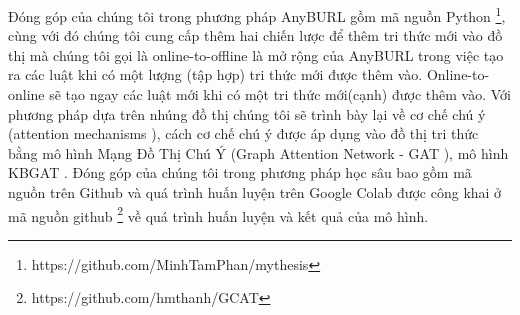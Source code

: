 Đóng góp của chúng tôi trong phương pháp AnyBURL\cite{burl} gồm mã nguồn Python \footnote{https://github.com/MinhTamPhan/mythesis}, cùng với đó chúng tôi cung cấp thêm hai chiến lược để thêm tri thức mới vào đồ thị mà chúng tôi gọi là online-to-offline là mở rộng của AnyBURL trong việc tạo ra các luật khi có một lượng (tập hợp) tri thức mới được thêm vào. Online-to-online sẽ tạo ngay các luật mới khi có một tri thức mới(cạnh) được thêm vào.
Với phương pháp dựa trên nhúng đồ thị chúng tôi sẽ trình bày lại về cơ chế chú ý (attention mechanisms \cite{vaswani2017attention}), cách cơ chế chú ý được áp dụng vào đồ thị tri thức bằng mô hình Mạng Đồ Thị Chú Ý (Graph Attention Network - GAT \cite{velivckovic2017graph}), mô hình KBGAT \cite{nathani2019learning}.
Đóng góp của chúng tôi trong phương pháp học sâu bao gồm mã nguồn trên Github  và quá trình huấn luyện trên Google Colab được công khai ở mã nguồn github \footnote{https://github.com/hmthanh/GCAT} về quá trình huấn luyện và kết quả của mô hình.






